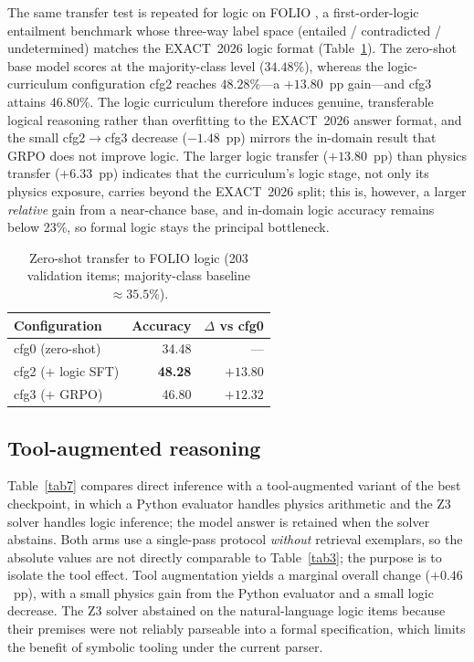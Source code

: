 \documentclass[APA,twocolumn]{USG}
\newcommand{\dataset}{EXACT~2026}
\begin{document}
The same transfer test is repeated for logic on FOLIO \citep{Han2022folio}, a
first-order-logic entailment benchmark whose three-way label space
(entailed / contradicted / undetermined) matches the \dataset{} logic format
(Table~\ref{tabfolio}). The zero-shot base model scores at the majority-class
level ($34.48\%$), whereas the logic-curriculum configuration cfg2 reaches
$48.28\%$---a $+13.80$~pp gain---and cfg3 attains $46.80\%$. The logic curriculum
therefore induces genuine, transferable logical reasoning rather than overfitting
to the \dataset{} answer format, and the small cfg2$\rightarrow$cfg3 decrease
($-1.48$~pp) mirrors the in-domain result that GRPO does not improve logic. The
larger logic transfer ($+13.80$~pp) than physics transfer ($+6.33$~pp) indicates
that the curriculum's logic stage, not only its physics exposure, carries beyond
the \dataset{} split; this is, however, a larger \emph{relative} gain from a
near-chance base, and in-domain logic accuracy remains below 23\%, so formal
logic stays the principal bottleneck.

\begin{table}[t]
\centering
\caption{Zero-shot transfer to FOLIO logic (203 validation items;
majority-class baseline $\approx 35.5\%$).\label{tabfolio}}
\begin{tabular*}{\columnwidth}{@{\extracolsep\fill}lrr@{\extracolsep\fill}}
\toprule
\textbf{Configuration} & \textbf{Accuracy} & \textbf{$\Delta$ vs cfg0} \\
\midrule
cfg0 (zero-shot)     & 34.48 & --- \\
cfg2 ($+$ logic SFT) & \textbf{48.28} & $+13.80$ \\
cfg3 ($+$ GRPO)      & 46.80 & $+12.32$ \\
\bottomrule
\end{tabular*}
\end{table}

\subsection{Tool-augmented reasoning}
Table~\ref{tab7} compares direct inference with a tool-augmented variant of the
best checkpoint, in which a Python evaluator handles physics arithmetic and the
Z3 solver handles logic inference; the model answer is retained when the solver
abstains. Both arms use a single-pass protocol \emph{without} retrieval
exemplars, so the absolute values are not directly comparable to
Table~\ref{tab3}; the purpose is to isolate the tool effect. Tool augmentation
yields a marginal overall change ($+0.46$~pp), with a small physics gain from the
Python evaluator and a small logic decrease. The Z3 solver abstained on the
natural-language logic items because their premises were not reliably parseable
into a formal specification, which limits the benefit of symbolic tooling under
the current parser.
\end{document}
